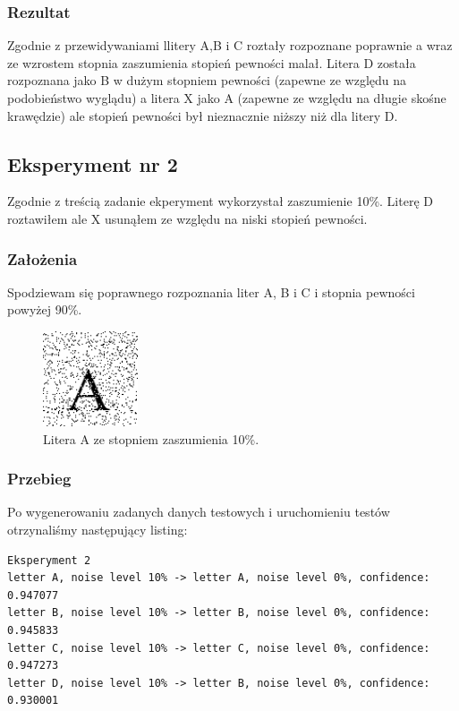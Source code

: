\documentclass[12pt]{article}
\begin{document}
\subsubsection{Rezultat}
Zgodnie z przewidywaniami llitery A,B i C roztały rozpoznane poprawnie a wraz ze wzrostem stopnia zaszumienia stopień pewności malał. Litera D została rozpoznana jako B w dużym stopniem pewności (zapewne ze względu na podobieństwo wyglądu) a litera X jako A (zapewne ze względu na długie skośne krawędzie) ale stopień pewności był nieznacznie niższy niż dla litery D.\\

\subsection{Eksperyment nr 2}
Zgodnie z treścią zadanie ekperyment wykorzystał zaszumienie 10\%. Literę D roztawiłem ale X usunąłem ze względu na niski stopień pewności.

\subsubsection{Założenia}
Spodziewam się poprawnego rozpoznania liter A, B i C i stopnia pewności powyżej 90\%.\\
\begin{figure}[h]
    \centering
    \includegraphics[width=0.25\textwidth]{A_10.png}
    \caption{Litera A ze stopniem zaszumienia 10\%.}
    \label{fig:A_10}
\end{figure}

\subsubsection{Przebieg}
Po wygenerowaniu zadanych danych testowych i uruchomieniu testów otrzynaliśmy następujący listing:
\begin{verbatim}
Eksperyment 2
letter A, noise level 10% -> letter A, noise level 0%, confidence: 0.947077
letter B, noise level 10% -> letter B, noise level 0%, confidence: 0.945833
letter C, noise level 10% -> letter C, noise level 0%, confidence: 0.947273
letter D, noise level 10% -> letter B, noise level 0%, confidence: 0.930001
\end{verbatim}
\end{document}
